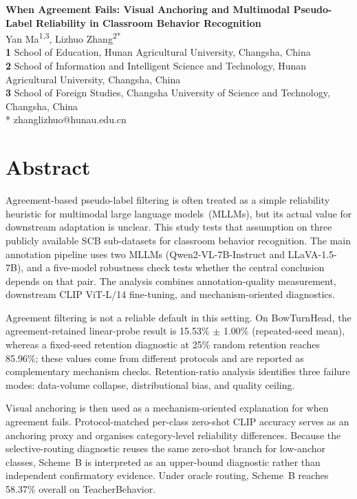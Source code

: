 \documentclass[10pt,letterpaper]{article}
\begin{document}
\vspace*{0.2in}

\begin{flushleft}
{\Large
\textbf{When Agreement Fails: Visual Anchoring and Multimodal Pseudo-Label Reliability in Classroom Behavior Recognition}
}
\newline
\\
Yan Ma\textsuperscript{1,3},
Lizhuo Zhang\textsuperscript{2*}
\\
\bigskip
\textbf{1} School of Education, Hunan Agricultural University, Changsha, China
\\
\textbf{2} School of Information and Intelligent Science and Technology, Hunan Agricultural University, Changsha, China
\\
\textbf{3} School of Foreign Studies, Changsha University of Science and Technology, Changsha, China
\\
\bigskip
* zhanglizhuo@hunau.edu.cn
\end{flushleft}

\section*{Abstract}
Agreement-based pseudo-label filtering is often treated as a simple
reliability heuristic for multimodal large language models~(MLLMs),
but its actual value for downstream adaptation is unclear.
This study tests that assumption on three publicly available SCB
sub-datasets for classroom behavior recognition.
The main annotation pipeline uses two MLLMs (Qwen2-VL-7B-Instruct and
LLaVA-1.5-7B), and a five-model robustness check tests whether the
central conclusion depends on that pair.
The analysis combines annotation-quality measurement, downstream CLIP
ViT-L/14 fine-tuning, and mechanism-oriented diagnostics.

Agreement filtering is not a reliable default in this setting.
On BowTurnHead, the agreement-retained linear-probe result is
15.53\% $\pm$ 1.00\% (repeated-seed mean), whereas a fixed-seed
retention diagnostic at 25\% random retention reaches 85.96\%; these
values come from different protocols and are reported as complementary
mechanism checks.
Retention-ratio analysis identifies three failure modes:
data-volume collapse, distributional bias, and quality ceiling.

Visual anchoring is then used as a mechanism-oriented explanation for
when agreement fails.
Protocol-matched per-class zero-shot CLIP accuracy serves as an
anchoring proxy and organises category-level reliability differences.
Because the selective-routing diagnostic reuses the same zero-shot
branch for low-anchor classes, Scheme~B is interpreted as an
upper-bound diagnostic rather than independent confirmatory evidence.
Under oracle routing, Scheme~B reaches 58.37\% overall on
TeacherBehavior.
\end{document}
